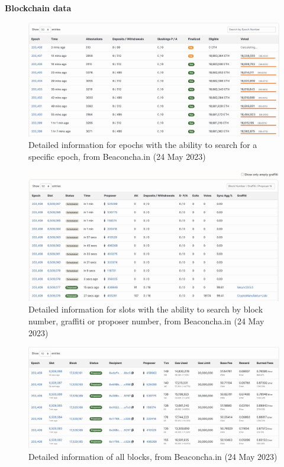 \documentclass[UTF8]{article}
\begin{document}
\textbf{Blockchain data}
\begin{figure}[htbp]
\begin{center}
\includegraphics[width=0.9\linewidth]{images/bepochs}
\caption{Detailed information for epochs with the ability to search for a specific epoch, from Beaconcha.in (24 May 2023)}
\label{fig:bepochs}
\end{center}
\end{figure}

\begin{figure}[htbp]
\begin{center}
\includegraphics[width=0.9\linewidth]{images/bslots}
\caption{Detailed information for slots with the ability to search by block number, graffiti or proposer number, from Beaconcha.in (24 May 2023)}
\label{fig:bslots}
\end{center}
\end{figure}

\begin{figure}[htbp]
\begin{center}
\includegraphics[width=0.9\linewidth]{images/bblocks}
\caption{Detailed information of all blocks, from Beaconcha.in (24 May 2023)}
\label{fig:bblocks}
\end{center}
\end{figure}
\end{document}
